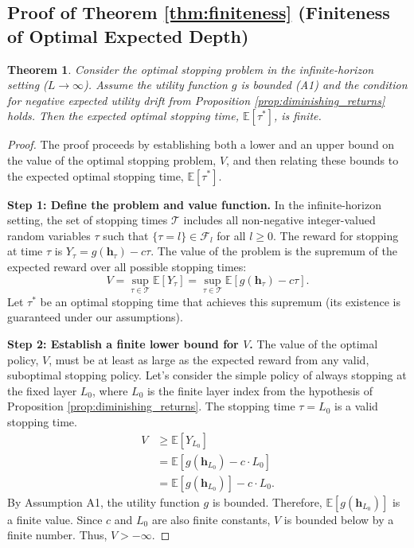 \documentclass[12pt]{imsart}
\newcommand{\E}{\mathbb{E}}
\newcommand{\F}{\mathcal{F}}
\newcommand{\h}{\mathbf{h}}
\theoremstyle{plain}
\newtheorem{theorem}{Theorem}[section]
\theoremstyle{definition}
\begin{document}
\subsection{Proof of Theorem \ref{thm:finiteness} (Finiteness of Optimal Expected Depth)}

\begin{theorem}
Consider the optimal stopping problem in the infinite-horizon setting ($L \to \infty$). Assume the utility function $g$ is bounded (A1) and the condition for negative expected utility drift from Proposition \ref{prop:diminishing_returns} holds. Then the expected optimal stopping time, $\E[\tau^*]$, is finite.
\end{theorem}

\begin{proof}
The proof proceeds by establishing both a lower and an upper bound on the value of the optimal stopping problem, $V$, and then relating these bounds to the expected optimal stopping time, $\E[\tau^*]$.

\textbf{Step 1: Define the problem and value function.}
In the infinite-horizon setting, the set of stopping times $\mathcal{T}$ includes all non-negative integer-valued random variables $\tau$ such that $\{\tau=l\} \in \F_l$ for all $l \ge 0$. The reward for stopping at time $\tau$ is $Y_\tau = g(\h_\tau) - c\tau$. The value of the problem is the supremum of the expected reward over all possible stopping times:
\[ V = \sup_{\tau \in \mathcal{T}} \E[Y_\tau] = \sup_{\tau \in \mathcal{T}} \E[g(\h_\tau) - c\tau]. \]
Let $\tau^*$ be an optimal stopping time that achieves this supremum (its existence is guaranteed under our assumptions).

\textbf{Step 2: Establish a finite lower bound for $V$.}
The value of the optimal policy, $V$, must be at least as large as the expected reward from any valid, suboptimal stopping policy. Let's consider the simple policy of always stopping at the fixed layer $L_0$, where $L_0$ is the finite layer index from the hypothesis of Proposition \ref{prop:diminishing_returns}. The stopping time $\tau = L_0$ is a valid stopping time.
\begin{align*}
V &\ge \E[Y_{L_0}] \\
  &= \E[g(\h_{L_0}) - c \cdot L_0] \\
  &= \E[g(\h_{L_0})] - c \cdot L_0.
\end{align*}
By Assumption A1, the utility function $g$ is bounded. Therefore, $\E[g(\h_{L_0})]$ is a finite value. Since $c$ and $L_0$ are also finite constants, $V$ is bounded below by a finite number. Thus, $V > -\infty$.


\end{proof}
\end{document}
